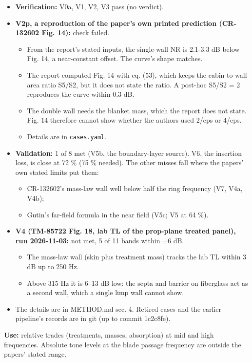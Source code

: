 \documentclass[10pt,a4paper]{article}
\begin{document}
\begin{itemize}
\item \textbf{Verification:} V0a, V1, V2, V3 pass (no verdict).
\item \textbf{V2p, a reproduction of the paper's own printed prediction (CR-132602 Fig. 14):} check failed.
\begin{itemize}
\item From the report's stated inputs, the single-wall NR is 2.1-3.3 dB below Fig. 14, a near-constant offset. The curve's shape matches.
\item The report computed Fig. 14 with eq. (53), which keeps the cabin-to-wall area ratio S5/S2, but it does not state the ratio. A post-hoc S5/S2 = 2 reproduces the curve within 0.3 dB.
\item The double wall needs the blanket mass, which the report does not state. Fig. 14 therefore cannot show whether the authors used 2/eps or 4/eps.
\item Details are in \texttt{cases.\allowbreak{}yaml}.
\end{itemize}
\item \textbf{Validation:} 1 of 8 met (V5b, the boundary-layer source). V6, the insertion loss, is close at 72 \% (75 \% needed). The other misses fall where the papers' own stated limits put them:
\begin{itemize}
\item CR-132602's mass-law wall well below half the ring frequency (V7, V4a, V4b);
\item Gutin's far-field formula in the near field (V5c; V5 at 64 \%).
\end{itemize}
\item \textbf{V4 (TM-85722 Fig. 18, lab TL of the prop-plane treated panel), run 2026-11-03:} not met, 5 of 11 bands within ±6 dB.
\begin{itemize}
\item The mass-law wall (skin plus treatment mass) tracks the lab TL within 3 dB up to 250 Hz.
\item Above 315 Hz it is 6–13 dB low: the septa and barrier on fiberglass act as a second wall, which a single limp wall cannot show.
\end{itemize}
\item The details are in METHOD.md sec. 4. Retired cases and the earlier pipeline's records are in git (up to commit 1c2c8fe).
\end{itemize}

\textbf{Use:} relative trades (treatments, masses, absorption) at mid and high frequencies. Absolute tone levels at the blade passage frequency are outside the papers' stated range.
\end{document}
